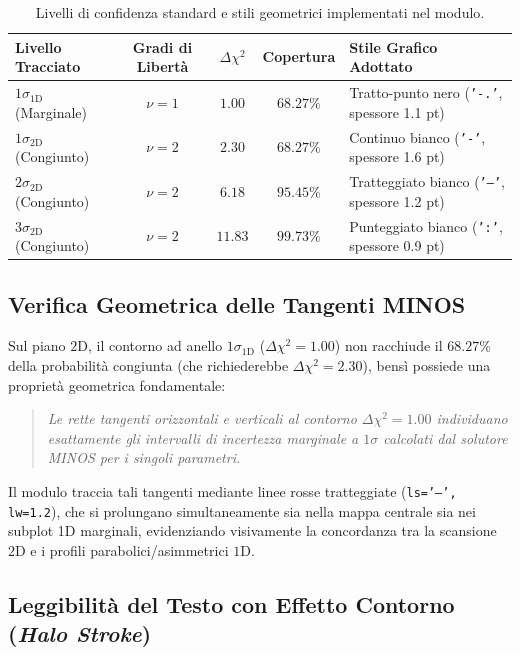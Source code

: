 \documentclass[11pt,a4paper]{article}
\begin{document}
\begin{table}[htbp]
\centering
\small
\begin{tabularx}{\textwidth}{l c c c X}
\toprule
\textbf{Livello Tracciato} & \textbf{Gradi di Libertà} & $\Delta\chi^2$ & \textbf{Copertura} & \textbf{Stile Grafico Adottato} \\
\midrule
$1\sigma_{\text{1D}}$ (Marginale) & $\nu = 1$ & $1.00$ & $68.27\%$ & Tratto-punto nero (\texttt{'-.'}, spessore 1.1 pt) \\
$1\sigma_{\text{2D}}$ (Congiunto) & $\nu = 2$ & $2.30$ & $68.27\%$ & Continuo bianco (\texttt{'-'}, spessore 1.6 pt) \\
$2\sigma_{\text{2D}}$ (Congiunto) & $\nu = 2$ & $6.18$ & $95.45\%$ & Tratteggiato bianco (\texttt{'--'}, spessore 1.2 pt) \\
$3\sigma_{\text{2D}}$ (Congiunto) & $\nu = 2$ & $11.83$ & $99.73\%$ & Punteggiato bianco (\texttt{':'}, spessore 0.9 pt) \\
\bottomrule
\end{tabularx}
\caption{Livelli di confidenza standard e stili geometrici implementati nel modulo.}
\end{table}

\subsection{Verifica Geometrica delle Tangenti MINOS}

Sul piano $2\mathrm{D}$, il contorno ad anello $1\sigma_{\text{1D}}$ ($\Delta\chi^2 = 1.00$) non racchiude il $68.27\%$ della probabilità congiunta (che richiederebbe $\Delta\chi^2 = 2.30$), bensì possiede una proprietà geometrica fondamentale:
\begin{quote}
\emph{Le rette tangenti orizzontali e verticali al contorno $\Delta\chi^2 = 1.00$ individuano esattamente gli intervalli di incertezza marginale a $1\sigma$ calcolati dal solutore MINOS per i singoli parametri.}
\end{quote}
Il modulo traccia tali tangenti mediante linee rosse tratteggiate (\texttt{ls='--', lw=1.2}), che si prolungano simultaneamente sia nella mappa centrale sia nei subplot 1D marginali, evidenziando visivamente la concordanza tra la scansione $2\mathrm{D}$ e i profili parabolici/asimmetrici $1\mathrm{D}$.

\subsection{Leggibilità del Testo con Effetto Contorno (\emph{Halo Stroke})}
\end{document}
